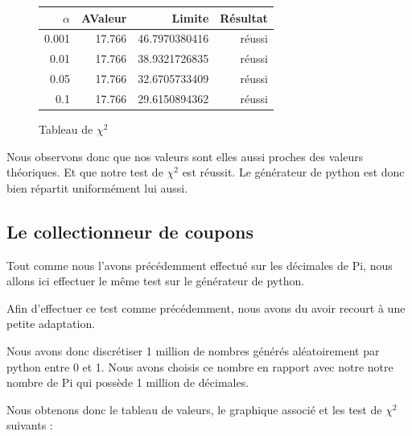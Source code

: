 \documentclass[10pt,a4paper]{article}
\begin{document}
\begin{figure}[h]
\centering
\begin{tabular}{|r|r|r|r|}
\hline
$\alpha$ & AValeur & Limite & Résultat\\
\hline
0.001 & 17.766 & 46.7970380416 & réussi\\
0.01 & 17.766 & 38.9321726835 & réussi\\
0.05 & 17.766 & 32.6705733409 & réussi\\
0.1 & 17.766 & 29.6150894362 & réussi\\
\hline
\end{tabular}
\caption{Tableau de $\chi^2$}
\end{figure}


\newpage

Nous observons donc que nos valeurs sont elles aussi proches des valeurs théoriques. Et que notre test de $\chi^2$  est réussit. Le générateur de python est donc bien répartit uniformément lui aussi.

\newpage

\subsection{Le collectionneur de coupons}

Tout comme nous l'avons précédemment effectué sur les décimales de Pi, nous allons ici effectuer le même test sur le générateur de python.

Afin d'effectuer ce test comme précédemment, nous avons du avoir recourt à une petite adaptation. 

Nous avons donc discrétiser 1 million de nombres générés aléatoirement par python entre 0 et 1. Nous avons choisis ce nombre en rapport avec notre notre nombre de Pi qui possède 1 million de décimales.

Nous obtenons donc le tableau de valeurs, le graphique associé et les test de $\chi^2$ suivants :
\end{document}

